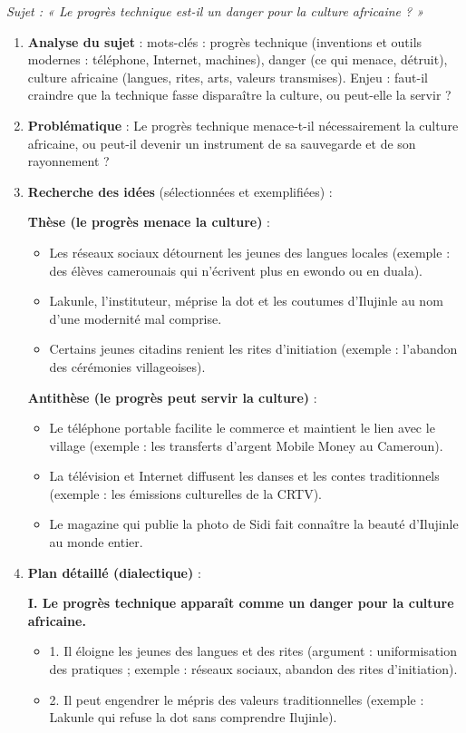 \documentclass[11pt]{article}
\begin{document}
\begin{corrige}
\textit{Sujet : « Le progrès technique est-il un danger pour la culture africaine ? »}
\begin{enumerate}
\item \textbf{Analyse du sujet} : mots-clés : \og progrès technique \fg{} (inventions et outils modernes : téléphone, Internet, machines), \og danger \fg{} (ce qui menace, détruit), \og culture africaine \fg{} (langues, rites, arts, valeurs transmises). Enjeu : faut-il craindre que la technique fasse disparaître la culture, ou peut-elle la servir ?
\item \textbf{Problématique} : \og Le progrès technique menace-t-il nécessairement la culture africaine, ou peut-il devenir un instrument de sa sauvegarde et de son rayonnement ? \fg
\item \textbf{Recherche des idées} (sélectionnées et exemplifiées) :

\textbf{Thèse (le progrès menace la culture)} :
\begin{itemize}
\item Les réseaux sociaux détournent les jeunes des langues locales (exemple : des élèves camerounais qui n'écrivent plus en ewondo ou en duala).
\item Lakunle, l'instituteur, méprise la dot et les coutumes d'Ilujinle au nom d'une modernité mal comprise.
\item Certains jeunes citadins renient les rites d'initiation (exemple : l'abandon des cérémonies villageoises).
\end{itemize}

\textbf{Antithèse (le progrès peut servir la culture)} :
\begin{itemize}
\item Le téléphone portable facilite le commerce et maintient le lien avec le village (exemple : les transferts d'argent Mobile Money au Cameroun).
\item La télévision et Internet diffusent les danses et les contes traditionnels (exemple : les émissions culturelles de la CRTV).
\item Le magazine qui publie la photo de Sidi fait connaître la beauté d'Ilujinle au monde entier.
\end{itemize}
\item \textbf{Plan détaillé (dialectique)} :

\textbf{I. Le progrès technique apparaît comme un danger pour la culture africaine.}
\begin{itemize}
\item 1. Il éloigne les jeunes des langues et des rites (argument : uniformisation des pratiques ; exemple : réseaux sociaux, abandon des rites d'initiation).
\item 2. Il peut engendrer le mépris des valeurs traditionnelles (exemple : Lakunle qui refuse la dot sans comprendre Ilujinle).
\end{itemize}


\end{enumerate}
\end{corrige}
\end{document}
